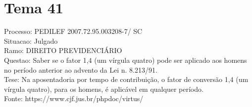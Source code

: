 \documentclass[12pt]{article}
\begin{document}
\section*{Tema 41}
Processo: PEDILEF 2007.72.95.003208-7/ SC\\
Situacao: Julgado\\
Ramo: DIREITO PREVIDENCIÁRIO\\
Questao: Saber se o fator 1,4 (um vírgula quatro) pode ser aplicado aos homens no período anterior ao advento da Lei n. 8.213/91.\\
Tese: Na aposentadoria por tempo de contribuição, o fator de conversão 1,4 (um vírgula quatro), para os homens, é aplicável em qualquer período.\\
Fonte: https://www.cjf.jus.br/phpdoc/virtus/
\end{document}
